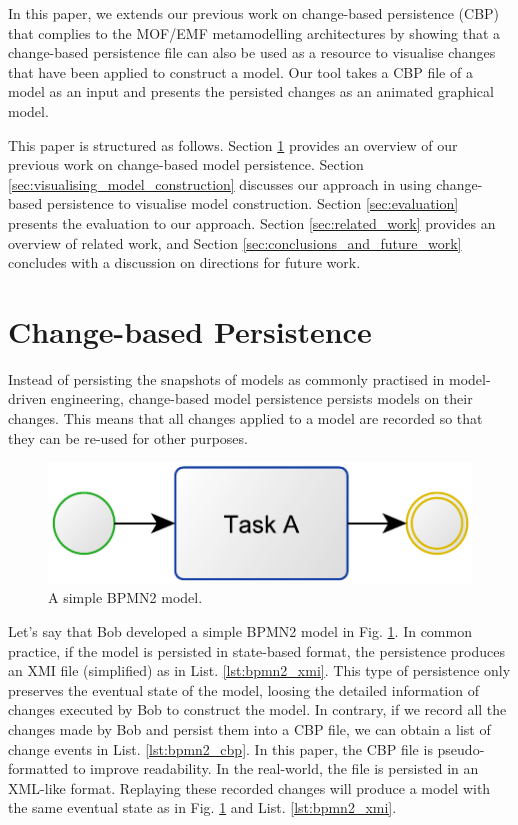 \documentclass[conference]{IEEEtran}
\begin{document}
In this paper, we extends our previous work on change-based persistence (CBP) that complies to the MOF/EMF metamodelling architectures
\cite{DBLP:conf/models/YohannisKP17,yohannis2018towards,DBLP:conf/models/YohannisRPK18,yohannis2018efficient}
by showing that a change-based persistence file can also be used as a resource to visualise changes that have been applied to construct a model. 
Our tool takes a CBP file of a model as an input and presents the persisted changes as an animated graphical model. 

This paper is structured as follows. 
Section \ref{sec:change-based_persistence} provides an overview of our previous work on change-based model persistence. 
Section \ref{sec:visualising_model_construction} discusses our approach in using change-based persistence to visualise model construction. 
Section \ref{sec:evaluation} presents the evaluation to our approach. 
Section \ref{sec:related_work} provides an overview of related work, and
Section \ref{sec:conclusions_and_future_work} concludes with a discussion on directions for future work.



\section{Change-based Persistence}
\label{sec:change-based_persistence}

Instead of persisting the snapshots of models as commonly practised in model-driven engineering, change-based model persistence persists models on their changes. 
This means that all changes applied to a model are recorded so that they can be re-used for other purposes. 

\begin{figure}[h]
    \centering
    \includegraphics[width=0.5\linewidth]{bpmn2}
    \caption{A simple BPMN2 model.}
    \label{fig:bpmn2}
\end{figure}

Let's say that Bob developed a simple BPMN2 model in Fig. \ref{fig:bpmn2}. In common practice, if the model is persisted in state-based format, 
the persistence produces an XMI file (simplified) as in List. \ref{lst:bpmn2_xmi}. This type of persistence only preserves the eventual state of the model,  
loosing the detailed information of changes executed by Bob to construct the model. In contrary, 
if we record all the changes made by Bob and persist them into a CBP file, we can obtain a list of change events in List. \ref{lst:bpmn2_cbp}.
In this paper, the CBP file is pseudo-formatted to improve readability. In the real-world, the file is persisted in an XML-like format.
Replaying these recorded changes will produce a model with the same eventual state as in Fig. \ref{fig:bpmn2} and List. \ref{lst:bpmn2_xmi}.
\end{document}
